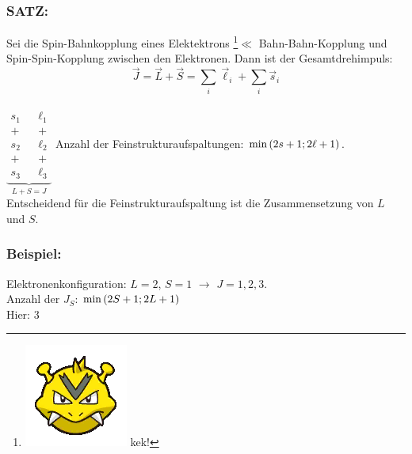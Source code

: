 \documentclass[Ex4_Zusammenfassung.tex]{subfiles}
\begin{document}
\subsubsection*{SATZ:}
Sei die Spin-Bahnkopplung eines Elektektrons \footnote{\includegraphics[scale=0.4]{elektektron.png} kek!}$\ll$ Bahn-Bahn-Kopplung und Spin-Spin-Kopplung zwischen den Elektronen. 
Dann ist der Gesamtdrehimpuls: 
$$\vec{J} = \vec{L} + \vec{S} = \sum_i \vec{\ell}_i + \sum_i \vec{s}_i$$ \\
$ \underbrace{	
		\begin{matrix}
			s_1 & & \ell_1\\
			+ & & + \\
			s_2 & & \ell_2\\
			+ & & + \\
			s_3 & & \ell_3
		\end{matrix}
		}_{L + S = J} $
\qquad Anzahl der Feinstrukturaufspaltungen: $\min \left( 2s+1; 2\ell+1 \right) $.\\

Entscheidend für die Feinstrukturaufspaltung ist die Zusammensetzung von $L$ und $S$.

\subsubsection*{Beispiel:}
Elektronenkonfiguration: $L=2$, $S=1$ $\rightarrow$ $J=1, 2, 3$.\\
Anzahl der $J_S$: $\min \left( 2S+1; 2L+1 \right)$ \\
Hier: 3
\end{document}
